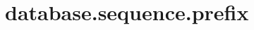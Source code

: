 \section{database.sequence.prefix}
\label{configuration:DatabaseSequencePrefix}
\AvailableInJavaOnly{\TODO}